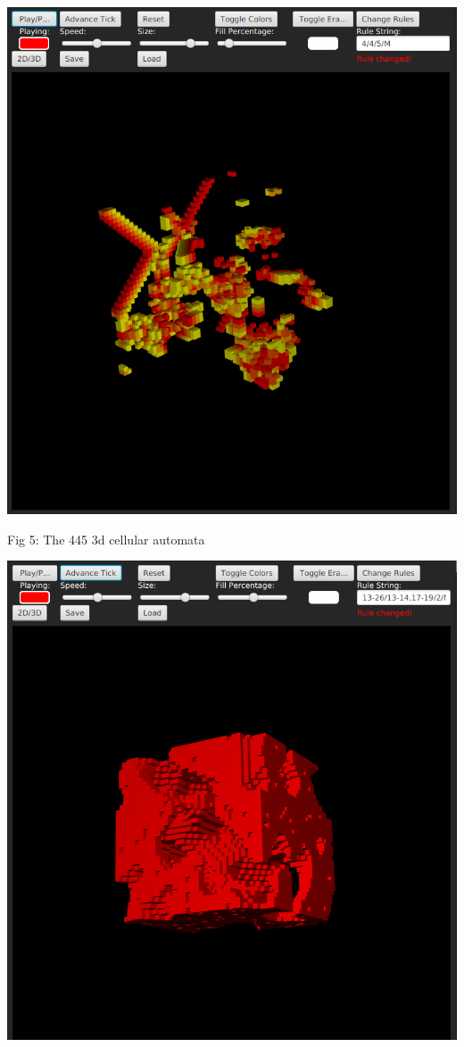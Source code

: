 \documentclass[11pt]{article}
\begin{document}
\begin{center}
\includegraphics[width=.9\linewidth]{./Fig5.png}
\end{center}
Fig 5: The 445 3d cellular automata
\begin{center}
\includegraphics[width=.9\linewidth]{./Fig6.png}
\end{center}
\end{document}
